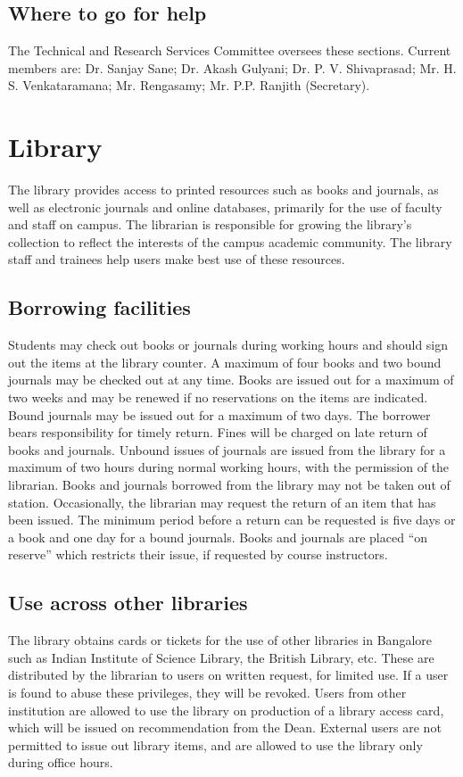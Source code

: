 \documentclass[a4paper,10pt]{article}
\begin{document}
\subsection{Where to go for help}

The Technical and Research Services Committee oversees these sections. Current members
are: Dr. Sanjay Sane; Dr. Akash Gulyani; Dr. P. V. Shivaprasad; Mr. H. S. Venkataramana;
Mr. Rengasamy; Mr. P.P. Ranjith (Secretary).

	
\section{Library}
The library provides access to printed resources such as books and journals, as well as
electronic journals and online databases, primarily for the use of faculty and staff on
campus. The librarian is responsible for growing the library’s collection to reflect the
interests of the campus academic community. The library staff and trainees help users make
best use of these resources.

\subsection{Borrowing facilities}
Students may check out books or journals during working hours and
should sign out the items at the library counter. A maximum of four books and two bound
journals may be checked out at any time. Books are issued out for a maximum of two weeks
and may be renewed if no reservations on the items are indicated. Bound journals may be
issued out for a maximum of two days. The borrower bears responsibility for timely return.
Fines will be charged on late return of books and journals. Unbound issues of journals are
issued from the library for a maximum of two hours during normal working hours, with the
permission of the librarian. Books and journals borrowed from the library may not be taken
out of station. Occasionally, the librarian may request the return of an item that has been
issued. The minimum period before a return can be requested is five days or a book and one
day for a bound journals. Books and journals are placed “on reserve” which restricts their
issue, if requested by course instructors.

\subsection{Use across other libraries}
The library obtains cards or tickets for the use of other libraries
in Bangalore such as Indian Institute of Science Library, the British Library, etc. These are
distributed by the librarian to users on written request, for limited use. If a user is found to
abuse these privileges, they will be revoked. Users from other institution are allowed to use
the library on production of a library access card, which will be issued on recommendation
from the Dean. External users are not permitted to issue out library items, and are allowed to
use the library only during office hours.
\end{document}
